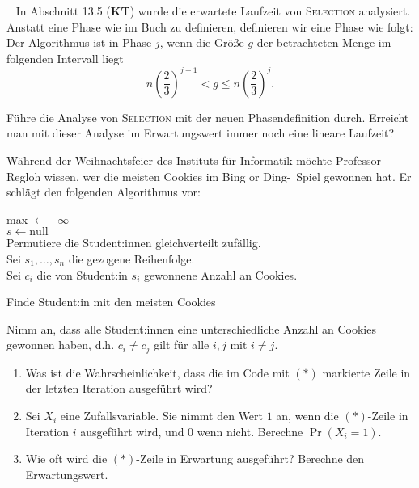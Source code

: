 \documentclass{uebung_cs}
\begin{document}
\begin{exercise}\
	In Abschnitt 13.5 (\textbf{KT}) wurde die erwartete Laufzeit von \textsc{Selection} analysiert.
	Anstatt eine Phase wie im Buch zu definieren, definieren wir eine Phase wie folgt:
	Der Algorithmus ist in Phase $j$, wenn die Größe $g$ der betrachteten Menge im folgenden Intervall liegt
	\[n\left(\frac{2}{3}\right)^{j+1} < g \leq n\left(\frac{2}{3}\right)^j. \]
	
	Führe die Analyse von \textsc{Selection} mit der neuen Phasendefinition durch. Erreicht man mit dieser Analyse im Erwartungswert immer noch eine lineare Laufzeit?
\end{exercise}    

\begin{exercise}[Weihnachtsfeier im Institut]
	Während der Weihnachtsfeier des Instituts für Informatik möchte Professor Regloh wissen, wer die meisten Cookies im \glqq Bing or Ding\grqq{}-~Spiel gewonnen hat. Er schlägt den folgenden Algorithmus vor: 

	\begin{algorithm}[H]
		\SetAlgoLined
		max $\gets -\infty$\\
		$s \gets \text{null}$\\
		Permutiere die Student:innen gleichverteilt zufällig. \\
		Sei $s_1,\dots,s_n$ die gezogene Reihenfolge.\\
		Sei $c_i$ die von Student:in $s_i$ gewonnene Anzahl an Cookies.\\
		\caption{Finde Student:in mit den meisten Cookies}
\end{algorithm}
	
	Nimm an, dass alle Student:innen eine unterschiedliche Anzahl an Cookies gewonnen haben, d.h. $c_i \neq c_j$ gilt für alle $i,j$ mit $i \neq j$.
	\begin{enumerate}
		\item Was ist die Wahrscheinlichkeit, dass die im Code mit $(\ast)$ markierte Zeile in der letzten Iteration ausgeführt wird?
		\item Sei $X_i$ eine Zufallsvariable. Sie nimmt den Wert $1$ an, wenn die $(\ast)$-Zeile in Iteration $i$ ausgeführt wird, und $0$ wenn nicht. Berechne $\Pr(X_i = 1)$.%
		\item Wie oft wird die $(\ast)$-Zeile in Erwartung ausgeführt? Berechne den Erwartungswert.
	\end{enumerate}
\end{exercise}
\end{document}
